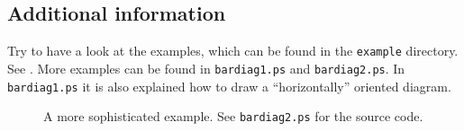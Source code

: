 \documentclass[12pt]{article}
\begin{document}
\subsection{Additional information \label{sec:2.7}}
Try to have a look at the examples, which can be found in the
\texttt{example} directory.
%
%
\clearpage
{}
See . More examples can be found in \texttt{bardiag1.ps} and
\texttt{bardiag2.ps}. In \texttt{bardiag1.ps} it is also explained how 
to draw a ``horizontally'' oriented diagram.

\begin{figure}[!ht]\centering
  
\caption{\label{fig:9} A more sophisticated example. See
   \texttt{bardiag2.ps} for the source code.}
\end{figure}
\end{document}
